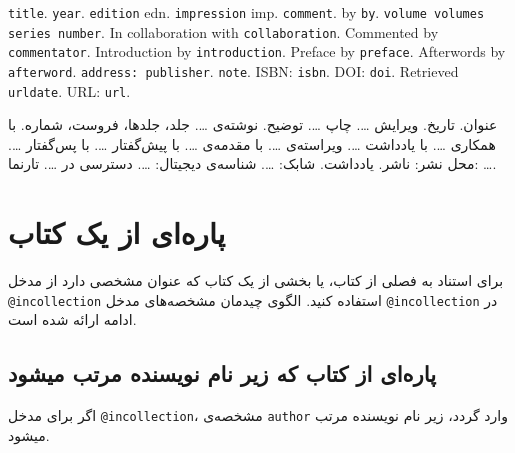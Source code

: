 \documentclass[a4paper,11pt]{article}
\begin{document}
\begin{itemize}[nosep]
\begin{latin}
\item[] []
{\tt title}. {\tt year}. {\tt edition} edn. {\tt impression} imp. {\tt comment}. by {\tt by}. {\tt volume volumes series number}. In collaboration with {\tt collaboration}. Commented by {\tt commentator}. Introduction by {\tt introduction}. Preface by {\tt preface}. Afterwords by {\tt afterword}. {\tt address: publisher}. {\tt note}. ISBN: {\tt isbn}. DOI: {\tt doi}. Retrieved {\tt urldate}. URL: {\tt url}. 
\end{latin}

\item[] []
{\persianttfamily عنوان}. {\persianttfamily تاریخ}. ویرایش {\persianttfamily …}. چاپ {\persianttfamily …}. {\persianttfamily توضیح}. نوشته‌ی {\persianttfamily …}. {\persianttfamily جلد، جلدها، فروست، شماره}. با همکاری {\persianttfamily …}. با یادداشت {\persianttfamily …}. ویراسته‌ی {\persianttfamily …}. با مقدمه‌ی {\persianttfamily …}. با پیش‌گفتار {\persianttfamily …}. با پس‌گفتار {\persianttfamily …}. {\persianttfamily محل نشر: ناشر}. {\persianttfamily یادداشت}. شابک: {\persianttfamily …}. شناسه‌ی دیجیتال: {\persianttfamily …}. دسترسی در {\persianttfamily …}. تارنما: {\persianttfamily …}.
\end{itemize}










\section{پاره‌ای از یک کتاب}
برای استناد به فصلی از کتاب، یا بخشی از یک کتاب که عنوان مشخصی دارد از مدخل \verb|@incollection| استفاده کنید. الگوی چیدمان مشخصه‌های مدخل \verb|@incollection| در ادامه ارائه شده است.





\subsection{پاره‌ای از کتاب که زیر نام نویسنده مرتب میشود}
اگر برای مدخل \verb|@incollection|، مشخصه‌ی \verb|author| وارد گردد، زیر نام نویسنده مرتب میشود.
\end{document}

